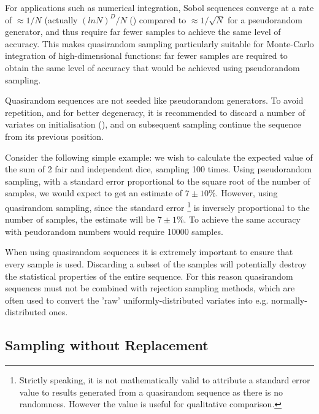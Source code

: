 \documentclass{JASSS}
\begin{document}
For applications such as numerical integration, Sobol sequences converge
at a rate of \(\approx1/N\) (actually \((ln N)^D/N\) (\cite{press_numerical_nodate})
compared to \(\approx1/\sqrt N\) for a pseudorandom generator, and thus
require far fewer samples to achieve the same level of accuracy. This makes quasirandom sampling particularly suitable for Monte-Carlo integration of high-dimensional functions: far fewer samples are required to obtain the same level of accuracy that would be achieved using pseudorandom sampling. 

Quasirandom sequences are not seeded like pseudorandom generators. To
avoid repetition, and for better degeneracy, it is recommended to
discard a number of variates on initialisation (\cite{joe_remark_2003}), and
on subsequent sampling continue the sequence from its previous position.

Consider the following simple example: we wish to calculate the expected value of the sum of 2 fair and independent dice, sampling 100 times. Using pseudorandom sampling, with a standard error proportional to the square root of the number of samples, we would expect to get an estimate of \(7 \pm 10\%\). However, using quasirandom sampling, since the standard error
\footnote{Strictly speaking, it is not mathematically valid to attribute a standard error value to results generated from a quasirandom sequence as there is no randomness. However the value is useful for qualitative comparison.} 
  is inversely proportional to the number of samples, the estimate will be \(7 \pm 1\%\). To achieve the same accuracy with peudorandom numbers would require 10000 samples.

When using quasirandom sequences it is extremely important to ensure that every sample is used. Discarding a subset of the samples will potentially destroy the statistical properties of the entire sequence. For this reason quasirandom sequences must not be combined with rejection sampling methods, which are often used to convert the 'raw' uniformly-distributed variates into e.g. normally-distributed ones.


\subsection{Sampling without Replacement}\label{sampling-without-replacement}
\end{document}
